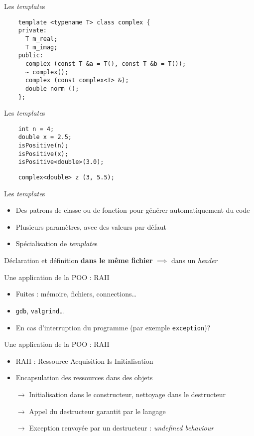 \begin{frame}[fragile]{Les \textit{template}s}
  \begin{lstlisting}
    template <typename T> class complex {
    private:
      T m_real;
      T m_imag;
    public:
      complex (const T &a = T(), const T &b = T());
      ~ complex();
      complex (const complex<T> &);
      double norm ();
    };
  \end{lstlisting}
\end{frame}

\begin{frame}[fragile]{Les \textit{template}s}
  \begin{lstlisting}
    int n = 4;
    double x = 2.5;
    isPositive(n);
    isPositive(x);
    isPositive<double>(3.0);
  \end{lstlisting}

  \begin{lstlisting}
    complex<double> z (3, 5.5);
  \end{lstlisting}
\end{frame}

\begin{frame}{Les \textit{template}s}
  \begin{itemize}
  \item  Des patrons de classe ou de fonction pour générer automatiquement du code
  \item Plusieurs paramètres, avec des valeurs par défaut
  \item Spécialisation de \textit{template}s
  \end{itemize}

  Déclaration et définition \textbf{dans le même fichier} $\implies$ dans un \textit{header}
\end{frame}

\begin{frame}{Une application de la POO : RAII}
  \begin{itemize}
  \item Fuites : mémoire, fichiers, connections\dots{}
  \item \texttt{gdb}, \texttt{valgrind}\dots{}
  \item En cas d'interruption du programme (par exemple \texttt{exception})?
  \end{itemize}
\end{frame}

\begin{frame}{Une application de la POO : RAII}
  \begin{itemize}
  \item RAII : Ressource Acquisition Is Initialisation
  \item Encapsulation des ressources dans des objets
  \item[$\rightarrow$] Initialisation dans le constructeur, nettoyage dans le destructeur
  \item[$\rightarrow$] Appel du destructeur garantit par le langage
  \item[$\rightarrow$] Exception renvoyée par un destructeur : \textit{undefined behaviour}
  \end{itemize}
\end{frame}
